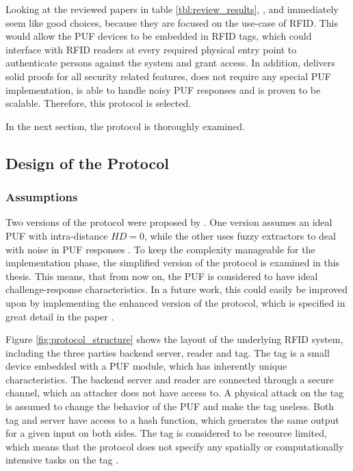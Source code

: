Looking at the reviewed papers in table \ref{tbl:review_results}, \cite{Gope2018}, \cite{Zhu2019} and \cite{Hristea2019} immediately
seem like good choices, because they are focused on the use-case of RFID.
This would allow the PUF devices to be embedded in RFID tags, which could interface with RFID readers
at every required physical entry point to authenticate persons against the system and grant access.
In addition, \cite{Zhu2019} delivers solid proofs for all security related features,
does not require any special PUF implementation, is able to handle noisy PUF responses
and is proven to be scalable. Therefore, this protocol is selected.

In the next section, the protocol is thoroughly examined.

\subsection{Design of the Protocol}
\label{sec:imp_design}

\subsubsection{Assumptions}

Two versions of the protocol were proposed by \citeauthor*{Zhu2019}. One version assumes an ideal PUF with
intra-distance $HD = 0$, while the other uses fuzzy extractors to deal with
noise in PUF responses \cite[][p. 6, 8]{Zhu2019}.
To keep the complexity manageable for the implementation phase, the simplified version of the protocol
is examined in this thesis. This means, that from now on, the PUF is considered to have ideal challenge-response
characteristics.
In a future work, this could easily be improved upon by implementing the enhanced version of the protocol,
which is specified in great detail in the paper \cite[][p. 8]{Zhu2019}.

Figure \ref{fig:protocol_structure} shows the layout of the underlying RFID system, including the three parties
backend server, reader and tag. The tag is a small device embedded with a PUF module, which has inherently unique
characteristics. The backend server and reader are connected through a secure channel, which an attacker
does not have access to. A physical attack on the tag is assumed to change the behavior of the PUF and make
the tag useless. Both tag and server have access to a hash function, which generates the same output for a given
input on both sides. The tag is considered to be resource limited, which means that the protocol does not specify any
spatially or computationally intensive tasks on the tag \cite[][p. 5]{Zhu2019}.


